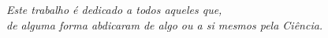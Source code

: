 \vspace*{\fill}
   \centering
   \noindent
   \textit{Este trabalho é dedicado a todos aqueles que,\\
   de alguma forma abdicaram de algo ou a si mesmos pela Ciência.} \vspace*{\fill}
